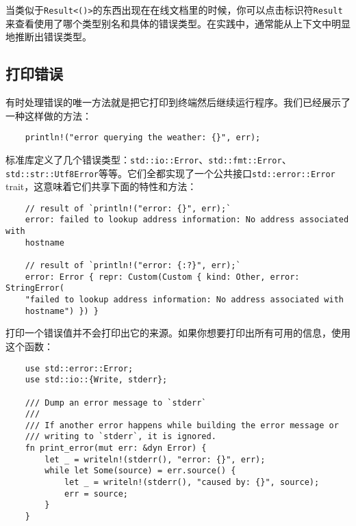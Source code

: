 当类似于\texttt{Result<()>}的东西出现在在线文档里的时候，你可以点击标识符\texttt{Result}来查看使用了哪个类型别名和具体的错误类型。在实践中，通常能从上下文中明显地推断出错误类型。

\subsection{打印错误}\label{printerror}
有时处理错误的唯一方法就是把它打印到终端然后继续运行程序。我们已经展示了一种这样做的方法：
\begin{verbatim}
    println!("error querying the weather: {}", err);
\end{verbatim}

标准库定义了几个错误类型：\texttt{std::io::Error}、\texttt{std::fmt::Error}、\texttt{std::str::Utf8Error}等等。它们全都实现了一个公共接口\texttt{std::error::Error} trait，这意味着它们共享下面的特性和方法：

\begin{verbatim}
    // result of `println!("error: {}", err);`
    error: failed to lookup address information: No address associated with
    hostname

    // result of `println!("error: {:?}", err);`
    error: Error { repr: Custom(Custom { kind: Other, error: StringError(
    "failed to lookup address information: No address associated with
    hostname") }) }
\end{verbatim}



打印一个错误值并不会打印出它的来源。如果你想要打印出所有可用的信息，使用这个函数：
\begin{verbatim}
    use std::error::Error;
    use std::io::{Write, stderr};

    /// Dump an error message to `stderr`
    ///
    /// If another error happens while building the error message or
    /// writing to `stderr`, it is ignored.
    fn print_error(mut err: &dyn Error) {
        let _ = writeln!(stderr(), "error: {}", err);
        while let Some(source) = err.source() {
            let _ = writeln!(stderr(), "caused by: {}", source);
            err = source;
        }
    }
\end{verbatim}

